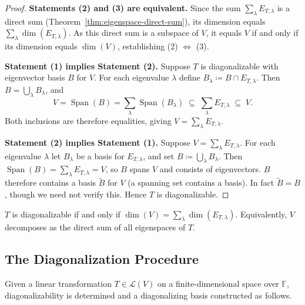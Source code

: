 \documentclass[11pt, a4paper, notitlepage]{report}
\theoremstyle{definition}
\theoremstyle{remark}
\begin{document}
\begin{proof}
\textbf{Statements (2) and (3) are equivalent.}
Since the sum $\sum_\lambda E_{T,\lambda}$ is a direct sum
(Theorem~\ref{thm:eigenspace-direct-sum}), its dimension equals
$\sum_\lambda \dim(E_{T,\lambda})$. As this direct sum is a subspace of $V$, it equals $V$
if and only if its dimension equals $\dim(V)$, establishing (2) $\iff$ (3).

\textbf{Statement (1) implies Statement (2).}
Suppose $T$ is diagonalizable with eigenvector basis $B$ for $V$.
For each eigenvalue $\lambda$ define $B_\lambda \coloneqq B \cap E_{T,\lambda}$.
Then $B = \bigcup_\lambda B_\lambda$, and
\[
  V = \operatorname{Span}(B)
  = \sum_\lambda \operatorname{Span}(B_\lambda)
  \;\subseteq\; \sum_\lambda E_{T,\lambda} \;\subseteq\; V.
\]
Both inclusions are therefore equalities, giving $V = \sum_\lambda E_{T,\lambda}$.

\textbf{Statement (2) implies Statement (1).}
Suppose $V = \sum_\lambda E_{T,\lambda}$. For each eigenvalue $\lambda$ let $B_\lambda$ be a
basis for $E_{T,\lambda}$, and set $B \coloneqq \bigcup_\lambda B_\lambda$. Then
$\operatorname{Span}(B) = \sum_\lambda E_{T,\lambda} = V$, so $B$ spans $V$ and consists of
eigenvectors. $B$ therefore contains a basis $\tilde{B}$ for $V$ (a spanning set contains a
basis). In fact $\tilde{B} = B$, though we need not verify this. Hence $T$ is diagonalizable.
\end{proof}

\begin{keyresult}[title={Key Result: Fundamental Theorem of Diagonalizability}]
$T$ is diagonalizable if and only if $\dim(V) = \sum_\lambda \dim(E_{T,\lambda})$.
Equivalently, $V$ decomposes as the direct sum of all eigenspaces of $T$.
\end{keyresult}

\subsection{The Diagonalization Procedure}

Given a linear transformation $T \in \mathcal{L}(V)$ on a finite-dimensional space over $\mathbb{F}$,
diagonalizability is determined and a diagonalizing basis constructed as follows.
\end{document}
